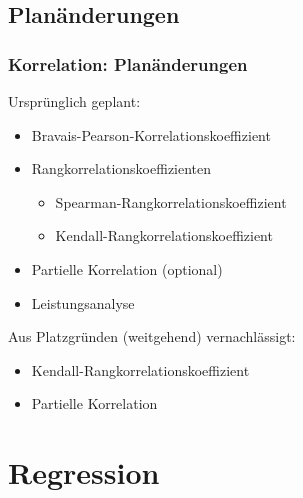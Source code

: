 \documentclass{beamer}
\begin{document}
\subsection{Planänderungen}

\begin{frame}
  \frametitle{Korrelation: Planänderungen}
	
	Ursprünglich geplant:
	\begin{itemize}
		\item Bravais-Pearson-Korrelationskoeffizient
		\item Rangkorrelationskoeffizienten
		\begin{itemize}
			\item Spearman-Rangkorrelationskoeffizient
			\item Kendall-Rangkorrelationskoeffizient
		\end{itemize}
		\item Partielle Korrelation (optional)
		\item Leistungsanalyse
	\end{itemize}
	
	\pause
	
	Aus Platzgründen (weitgehend) vernachlässigt:
	\begin{itemize}
		\item Kendall-Rangkorrelationskoeffizient
		\item Partielle Korrelation
	\end{itemize}
\end{frame}

\section{Regression}
\end{document}
